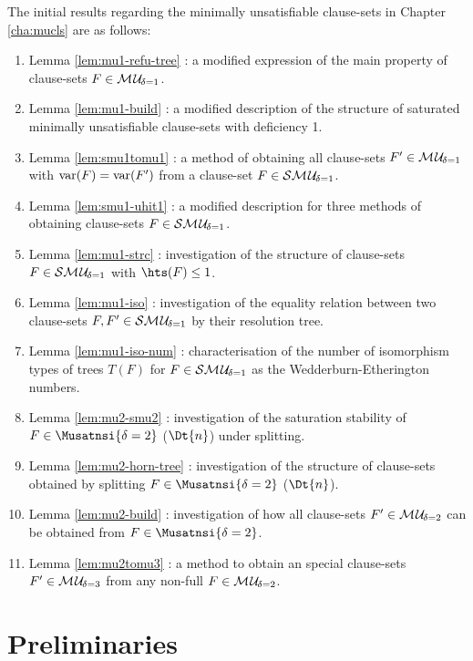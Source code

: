 \documentclass{report}
\begin{document}
The initial results regarding the minimally unsatisfiable clause-sets in Chapter \ref{cha:mucls} are as follows:
  \begin{enumerate}
  \item Lemma \ref{lem:mu1-refu-tree} : a modified expression of the main property of clause-sets $F \in \mathcal{M\hspace{0.8pt}U}_{\!\delta=1}$.
  \item Lemma \ref{lem:mu1-build} : a modified description of the structure of saturated minimally unsatisfiable clause-sets with deficiency 1.
  \item Lemma \ref{lem:smu1tomu1} : a method of obtaining all clause-sets $F' \in \mathcal{M\hspace{0.8pt}U}_{\!\delta=1}$ with $\operatorname{var}(F)=\operatorname{var}(F')$ from a clause-set $F \in  \mathcal{S}\mathcal{M\hspace{0.8pt}U}_{\!\delta=1}$.
  \item Lemma \ref{lem:smu1-uhit1} : a modified description for three methods of obtaining clause-sets $F \in \mathcal{S}\mathcal{M\hspace{0.8pt}U}_{\!\delta=1}$.
  \item Lemma \ref{lem:mu1-strc} : investigation of the structure of clause-sets $F \in \mathcal{S}\mathcal{M\hspace{0.8pt}U}_{\!\delta=1}$ with $\hts(F) \le 1$.
  \item Lemma \ref{lem:mu1-iso} : investigation of the equality relation between two clause-sets $F,F' \in \mathcal{S}\mathcal{M\hspace{0.8pt}U}_{\!\delta=1}$ by their resolution tree.
  \item Lemma \ref{lem:mu1-iso-num} : characterisation of the number of isomorphism types of trees $T(F)$ for $F \in  \mathcal{S}\mathcal{M\hspace{0.8pt}U}_{\!\delta=1}$ as the Wedderburn-Etherington numbers.
  \item Lemma \ref{lem:mu2-smu2} : investigation of the saturation stability of $F \in  \Musatnsi{\delta=2}$ ($\Dt{n}$) under splitting.
  \item Lemma \ref{lem:mu2-horn-tree} : investigation of the structure of clause-sets obtained by splitting $F \in  \Musatnsi{\delta=2}$ ($\Dt{n}$).
  \item Lemma \ref{lem:mu2-build} : investigation of how all clause-sets $F' \in \mathcal{M\hspace{0.8pt}U}_{\!\delta=2}$ can be obtained from $F \in  \Musatnsi{\delta=2}$.
  \item Lemma \ref{lem:mu2tomu3} : a method to obtain an special clause-sets $F' \in \mathcal{M\hspace{0.8pt}U}_{\!\delta=3}$ from any non-full $F \in  \mathcal{M\hspace{0.8pt}U}_{\!\delta=2}$.
  \end{enumerate}

\chapter{Preliminaries}
\label{cha:Preliminaries}
\end{document}
